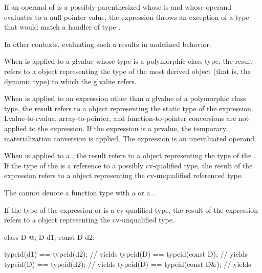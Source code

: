 \pnum
If an  operand of  is
a possibly-parenthesized 
whose  is \tcode{*} and
whose operand evaluates to a null pointer value,
the  expression throws an exception
of a type that would match a handler of type
%
%
.
\begin{note}
In other contexts, evaluating such a 
results in undefined behavior.
\end{note}

\pnum
When  is applied to a glvalue whose type is a
polymorphic class type, the result refers to a
 object representing the type of the most derived
object (that is, the dynamic type) to which the
glvalue refers.

\pnum
When  is applied to an expression other than a glvalue of
a polymorphic class type, the result refers to a 
object representing the static type of the expression.
Lvalue-to-rvalue, array-to-pointer,
and function-to-pointer conversions are not applied to
the expression.
If the expression is a prvalue,
the temporary materialization conversion
is applied.
The expression is an unevaluated operand.

\pnum
When  is applied to a , the result
refers to a  object representing the type of the
. If the type of the  is a reference
to a possibly cv-qualified type, the result of the
 expression refers to a  object
representing the cv-unqualified referenced type.
\begin{note}
The  cannot denote a function type with
a  or a .
\end{note}

\pnum
If the type of the expression or  is a
cv-qualified type, the result of the  expression refers
to a  object representing the cv-unqualified
type.
\begin{example}
\begin{codeblock}
class D { @\commentellip@ };
D d1;
const D d2;

typeid(d1) == typeid(d2);       // yields 
typeid(D)  == typeid(const D);  // yields 
typeid(D)  == typeid(d2);       // yields 
typeid(D)  == typeid(const D&); // yields 
\end{codeblock}
\end{example}

